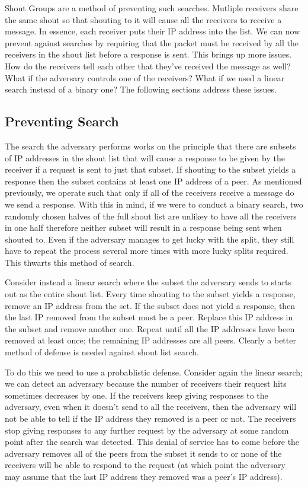 \documentclass[ %
                    author={Luke Murray},
                supervisor={Dr. Simon Hollis},
                     title={Shadow Peer-to-Peer Networks},
                  subtitle={},
                    degree={MEng},
                      year={2013} ]{thesis}
\begin{document}
Shout Groups are a method of preventing such searches. Mutliple receivers share the same shout so that shouting to it will cause all the receivers to receive a message. In essence, each receiver puts their IP address into the list. We can now prevent against searches by requiring that the packet must be received by all the receivers in the shout list before a response is sent. This brings up more issues. How do the receivers tell each other that they've received the message as well? What if the adversary controls one of the receivers? What if we used a linear search instead of a binary one? The following sections address these issues.

\subsection{Preventing Search}

The search the adversary performs works on the principle that there are subsets of IP addresses in the shout list that will cause a response to be given by the receiver if a request is sent to just that subset. If shouting to the subset yields a response then the subset contains at least one IP address of a peer. As mentioned previously, we operate such that only if all of the receivers receive a message do we send a response. With this in mind, if we were to conduct a binary search, two randomly chosen halves of the full shout list are unlikey to have all the receivers in one half therefore neither subset will result in a response being sent when shouted to. Even if the adversary manages to get lucky with the split, they still have to repeat the process several more times with more lucky splits required. This thwarts this method of search.

Consider instead a linear search where the subset the adversary sends to starts out as the entire shout list. Every time shouting to the subset yields a response, remove an IP address from the set. If the subset does not yield a response, then the last IP removed from the subset must be a peer. Replace this IP address in the subset and remove another one. Repeat until all the IP addresses have been removed at least once; the remaining IP addresses are all peers. Clearly a better method of defense is needed against shout list search.

To do this we need to use a probablistic defense. Consider again the linear search; we can detect an adversary because the number of receivers their request hits sometimes decreases by one. If the receivers keep giving responses to the adversary, even when it doesn't send to all the receivers, then the adversary will not be able to tell if the IP address they removed is a peer or not. The receivers stop giving responses to any further request by the adversary at some random point after the search was detected. This denial of service has to come before the adversary removes all of the peers from the subset it sends to or none of the receivers will be able to respond to the request (at which point the adversary may assume that the last IP address they removed was a peer's IP address).
\end{document}

